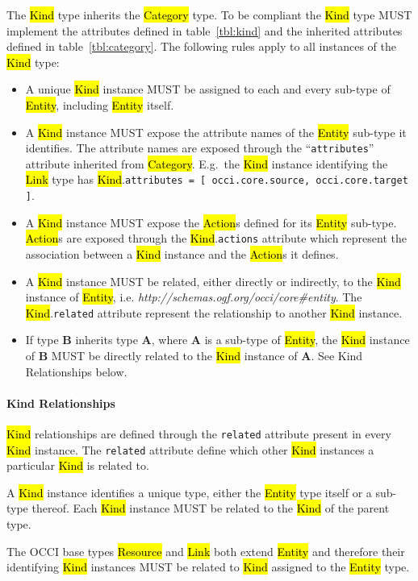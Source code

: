 \documentclass[10pt,a4paper]{article}
\begin{document}
The \hl{Kind} type inherits the \hl{Category} type. To be compliant
the \hl{Kind} type MUST implement the attributes defined in
table~\ref{tbl:kind} and the inherited attributes defined in
table~\ref{tbl:category}. The following rules apply to all instances
of the \hl{Kind} type:
%
\begin{itemize}
  \item A unique \hl{Kind} instance MUST be assigned to each and every
    sub-type of \hl{Entity}, including \hl{Entity} itself.
  \item A \hl{Kind} instance MUST expose the attribute names of the
    \hl{Entity} sub-type it identifies. The attribute names are
    exposed through the ``{\tt attributes}'' attribute inherited from
    \hl{Category}. E.g.~the \hl{Kind} instance identifying the
    \hl{Link} type has \hl{Kind}.{\tt attributes = [ occi.core.source, occi.core.target ]}.
  \item A \hl{Kind} instance MUST expose the \hl{Action}s defined for
    its \hl{Entity} sub-type. \hl{Action}s are exposed through the
    \hl{Kind}.{\tt actions} attribute which represent the association
    between a \hl{Kind} instance and the \hl{Action}s it defines.
  \item A \hl{Kind} instance MUST be related, either directly or
    indirectly, to the \hl{Kind} instance of \hl{Entity},
    i.e. \textit{http://schemas.ogf.org/occi/core\#entity}.  The
    \hl{Kind}.{\tt related} attribute represent the relationship to
    another \hl{Kind} instance.
  \item If type {\bf B} inherits type {\bf A}, where {\bf A} is a
    sub-type of \hl{Entity}, the \hl{Kind} instance of {\bf B} MUST be
    directly related to the \hl{Kind} instance of {\bf A}. See Kind
    Relationships below.
\end{itemize}

\paragraph*{Kind Relationships}
\hl{Kind} relationships are defined through the {\tt related}
attribute present in every \hl{Kind} instance. The {\tt related}
attribute define which other \hl{Kind} instances a particular
\hl{Kind} is related to.

A \hl{Kind} instance identifies a unique type, either the \hl{Entity}
type itself or a sub-type thereof.  Each \hl{Kind} instance MUST be
related to the \hl{Kind} of the parent type.

The OCCI base types \hl{Resource} and \hl{Link} both extend
\hl{Entity} and therefore their identifying \hl{Kind} instances MUST
be related to \hl{Kind} assigned to the \hl{Entity} type.
\end{document}
